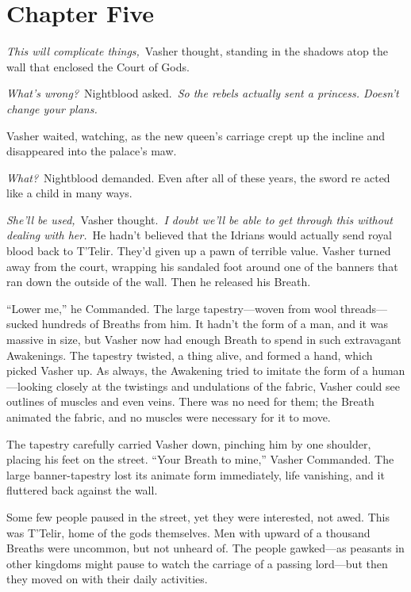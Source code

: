 \section{Chapter Five}

\textit{This will complicate things,}~Vasher thought, standing in the shadows atop the wall that enclosed the Court of Gods.

\textit{What’s wrong?}~Nightblood asked.~\textit{So the rebels actually sent a princess. Doesn’t change your plans.}

Vasher waited, watching, as the new queen’s carriage crept up the incline and disappeared into the palace’s maw.

\textit{What?}~Nightblood demanded. Even after all of these years, the sword re acted like a child in many ways.

\textit{She’ll be used,}~Vasher thought.~\textit{I doubt we’ll be able to get through this without dealing with her.}~He hadn’t believed that the Idrians would actually send royal blood back to T’Telir. They’d given up a pawn of terrible value. Vasher turned away from the court, wrapping his sandaled foot around one of the banners that ran down the outside of the wall. Then he released his Breath.

“Lower me,” he Commanded. The large tapestry—woven from wool threads—sucked hundreds of Breaths from him. It hadn’t the form of a man, and it was massive in size, but Vasher now had enough Breath to spend in such extravagant Awakenings. The tapestry twisted, a thing alive, and formed a hand, which picked Vasher up. As always, the Awakening tried to imitate the form of a human—looking closely at the twistings and undulations of the fabric, Vasher could see outlines of muscles and even veins. There was no need for them; the Breath animated the fabric, and no muscles were necessary for it to move.

The tapestry carefully carried Vasher down, pinching him by one shoulder, placing his feet on the street. “Your Breath to mine,” Vasher Commanded. The large banner-tapestry lost its animate form immediately, life vanishing, and it fluttered back against the wall.

Some few people paused in the street, yet they were interested, not awed. This was T’Telir, home of the gods themselves. Men with upward of a thousand Breaths were uncommon, but not unheard of. The people gawked—as peasants in other kingdoms might pause to watch the carriage of a passing lord—but then they moved on with their daily activities.


